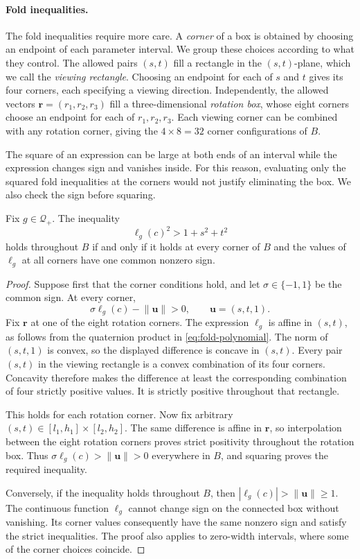 \paragraph{Fold inequalities.}
The fold inequalities require more care. A \emph{corner} of a box is
obtained by choosing an endpoint of each parameter interval. We group
these choices according to what they control. The allowed pairs $(s,t)$
fill a rectangle in the $(s,t)$-plane, which we call the \emph{viewing
rectangle}. Choosing an endpoint for each of $s$ and $t$ gives its four
corners, each specifying a viewing direction. Independently, the allowed
vectors $\mathbf r=(r_1,r_2,r_3)$ fill a three-dimensional \emph{rotation box},
whose eight corners choose an endpoint for each of $r_1,r_2,r_3$. Each viewing
corner can be combined with any rotation corner, giving the $4\times8=32$
corner configurations of $B$.

The square of an expression can be large at both ends of an
interval while the expression changes sign and vanishes inside. For this
reason, evaluating only the squared fold inequalities at the corners would
not justify eliminating the box. We also check the sign before squaring.

\begin{proposition}\label{prop:whole-box-fold-violation}
  Fix $g\in\mathcal Q_+$. The inequality
  \[
    {\ell_g(c)}^2>1+s^2+t^2
  \]
  holds throughout $B$ if and only if it holds at every corner of $B$
  and the values of $\ell_g$ at all corners have one common nonzero sign.
\end{proposition}
\begin{proof}
  Suppose first that the corner conditions hold, and let
  $\sigma\in\{-1,1\}$ be the common sign. At every corner,
  \[
    \sigma\ell_g(c)-\lVert\mathbf u\rVert>0,
    \qquad\mathbf u=(s,t,1).
  \]
  Fix $\mathbf r$ at one of the eight rotation corners. The expression $\ell_g$ is
  affine in $(s,t)$, as follows from the quaternion product in
  \cref{eq:fold-polynomial}.
  The norm of $(s,t,1)$ is convex, so the displayed difference is
  concave in $(s,t)$. Every pair $(s,t)$ in the viewing rectangle is a convex
  combination of its four corners. Concavity therefore makes the difference
  at least the corresponding combination of four strictly positive values.
  It is strictly positive throughout that rectangle.

  This holds for each rotation corner. Now fix arbitrary
  $(s,t)\in[l_1,h_1]\times[l_2,h_2]$.
  The same difference is affine in $\mathbf r$, so interpolation between
  the eight rotation corners proves strict positivity throughout the
  rotation box. Thus $\sigma\ell_g(c)>\lVert\mathbf u\rVert>0$ everywhere
  in $B$, and squaring proves the required inequality.

  Conversely, if the inequality holds throughout $B$, then
  $|\ell_g(c)|>\lVert\mathbf u\rVert\ge1$. The continuous function
  $\ell_g$ cannot change sign on the connected box without vanishing.
  Its corner values consequently have the same nonzero sign and satisfy
  the strict inequalities. The proof also applies to zero-width intervals,
  where some of the corner choices coincide.
\end{proof}

